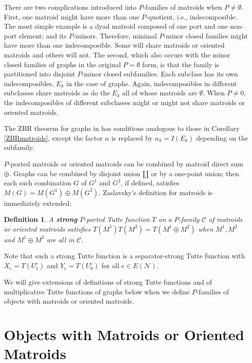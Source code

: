 \documentclass[12pt,leqno]{amsart}
\newtheorem{definition}[lem]{Definition}
\theoremstyle{remark}
\begin{document}
There are two  complications introduced
into $P$-families of matroids when $P\neq\emptyset$.
First, one matroid 
might have more than one $P$-quotient, i.e., indecomposible.
The most simple 
example is a dyad matroid composed of one port and one
non-port element; and its $P$-minors.
Therefore, minimal $P$-minor closed families might have 
more than one indecomposible.  Some will share
matroids or oriented matroids and others will not.
The second, which also occurs with the 
minor closed families of graphs \cite{Ellis-Monaghan-Traldi}
in the original $P=\emptyset$ form, is that
the family is partitioned into disjoint $P$-minor closed
subfamilies.  Each subclass has its own indecomposibles,
$E_k$ in the case of graphs.  Again, 
indecomposibles in different subclasses 
share matroids as do
the $E_k$ all of whose matroids are $\emptyset$.
When $P\neq 0$, the indecomposibles of different 
subclasses might or might not share matroids
or oriented matroids.

The ZBR theorem for graphs in \cite{Ellis-Monaghan-Traldi}
has conditions analogous to those in Corollary \ref{ZBRmatroids},
except the factor $\alpha$ is replaced by $\alpha_k=I(E_k)$
depending on the subfamily.  

$P$-ported matroids or oriented matroids can be combined 
by matroid direct sum $\oplus$.  Graphs can be combined
by disjoint union $\amalg$ or by a one-point union;
then each such combination $G$ of $G^1$ and $G^2$, if defined,
satisfies $M(G)=M(G^1)\oplus M(G^2)$.  
Zaslavsky's definition\cite{MR93a:05047} for 
matroids is immediately extended:


\begin{definition}
A \textbf{strong} $P$-ported Tutte function $T$ on a $P$-family 
$\mathcal{C}$ of matroids
or oriented matroids satisfies $T(M^1)T(M^2)=T(M^1\oplus M^2)$
when $M^1, M^2$ and $M^1\oplus M^2$ are all in $\mathcal{C}$.
\end{definition}

Note that such a strong Tutte function is a separator-strong
Tutte function with $X_e=T(U^e_1)$ and
$Y_e=T(U^e_0)$ for all $e\in E(\mathcal{N})$.

We will give extensions of definitions of strong Tutte functions
and of multiplicative Tutte functions of graphs below when
we define $P$-families of objects with matroids or oriented 
matroids.



\section{Objects with Matroids or Oriented Matroids}
\end{document}
